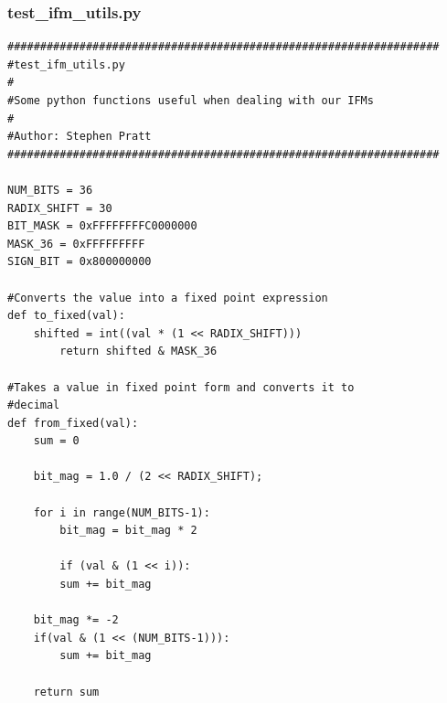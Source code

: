 \documentclass{article}
\begin{document}
\subsubsection{test\_ifm\_utils.py}				%
\begin{lstlisting}
##################################################################
#test_ifm_utils.py
#
#Some python functions useful when dealing with our IFMs
#
#Author: Stephen Pratt
##################################################################

NUM_BITS = 36
RADIX_SHIFT = 30
BIT_MASK = 0xFFFFFFFFC0000000
MASK_36	= 0xFFFFFFFFF
SIGN_BIT = 0x800000000

#Converts the value into a fixed point expression
def to_fixed(val):
	shifted = int((val * (1 << RADIX_SHIFT)))
        return shifted & MASK_36

#Takes a value in fixed point form and converts it to
#decimal
def from_fixed(val):
	sum = 0
	
	bit_mag = 1.0 / (2 << RADIX_SHIFT);

	for i in range(NUM_BITS-1):
	    bit_mag = bit_mag * 2

	    if (val & (1 << i)):
		sum += bit_mag
	
	bit_mag *= -2
	if(val & (1 << (NUM_BITS-1))):
		sum += bit_mag

	return sum
\end{lstlisting}
\end{document}
